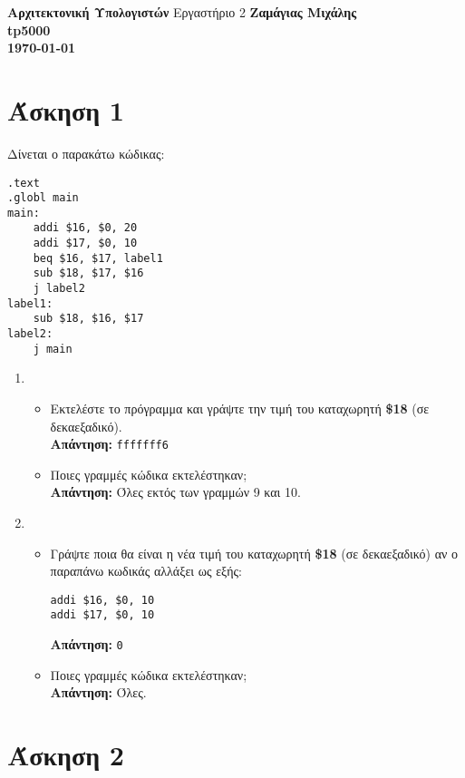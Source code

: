 \documentclass[a4paper,12pt]{article}
\begin{document}
\begin{titlepage}
    \begin{center}
        \vspace*{\fill}
        \huge{\textbf{Αρχιτεκτονική Υπολογιστών}}
        \vfill
        Εργαστήριο 2
        \vfill
        \vspace*{\fill}
        \vfill
        \normalsize\textbf{Ζαμάγιας Μιχάλης\\tp5000\\}
        \small\textbf{\today}
        \vfill
    \end{center}
\end{titlepage}



\section{Άσκηση 1}

Δίνεται ο παρακάτω κώδικας:
\begin{lstlisting}
.text
.globl main
main:
    addi $16, $0, 20
    addi $17, $0, 10
    beq $16, $17, label1
    sub $18, $17, $16
    j label2
label1:
    sub $18, $16, $17
label2:
    j main
\end{lstlisting}

\begin{enumerate}
    \item \begin{itemize}
              \item Εκτελέστε το πρόγραμμα και γράψτε την τιμή του
                    καταχωρητή \textbf{\$18} (σε δεκαεξαδικό).\\
                    \textbf{Απάντηση:} \texttt{fffffff6}
              \item Ποιες γραμμές κώδικα εκτελέστηκαν;\\
                    \textbf{Απάντηση:} Όλες εκτός των γραμμών 9 και 10.
          \end{itemize}
    \item \begin{itemize}
              \item Γράψτε ποια θα είναι η νέα τιμή του καταχωρητή \textbf{\$18} (σε δεκαεξαδικό) αν ο παραπάνω κωδικάς αλλάξει ως εξής:
                    \begin{lstlisting}[firstnumber=4]
addi $16, $0, 10
addi $17, $0, 10
\end{lstlisting}
                    \textbf{Απάντηση:} \texttt{0}
              \item Ποιες γραμμές κώδικα εκτελέστηκαν;\\
                    \textbf{Απάντηση:} Όλες.
          \end{itemize}
\end{enumerate}

\newpage
\section{Άσκηση 2}
\end{document}
